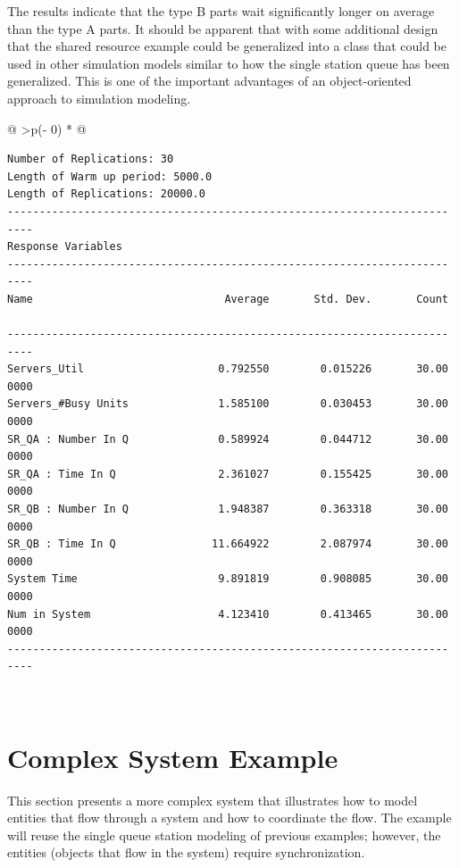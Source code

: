 \documentclass[
]{book}
\theoremstyle{definition}
\theoremstyle{definition}
\theoremstyle{definition}
\theoremstyle{definition}
\theoremstyle{remark}
\begin{document}
The results indicate that the type B parts wait
significantly longer on average than the type A parts. It should be
apparent that with some additional design that the shared resource
example could be generalized into a class that could be used in other
simulation models similar to how the single station queue has been
generalized. This is one of the important advantages of an
object-oriented approach to simulation modeling.

\begin{longtable}[]{@{}
  >{\centering\arraybackslash}p{(\columnwidth - 0\tabcolsep) * }@{}}
\toprule
\endhead
\begin{minipage}[t]{\linewidth}\raggedright
\hypertarget{fig:RSOutput}{%
\label{fig:RSOutput}}%
\begin{verbatim}
Number of Replications: 30
Length of Warm up period: 5000.0
Length of Replications: 20000.0
---------------------------------------------------------------------
----
Response Variables
---------------------------------------------------------------------
----
Name                              Average       Std. Dev.       Count

---------------------------------------------------------------------
----
Servers_Util                     0.792550        0.015226       30.00
0000
Servers_#Busy Units              1.585100        0.030453       30.00
0000
SR_QA : Number In Q              0.589924        0.044712       30.00
0000
SR_QA : Time In Q                2.361027        0.155425       30.00
0000
SR_QB : Number In Q              1.948387        0.363318       30.00
0000
SR_QB : Time In Q               11.664922        2.087974       30.00
0000
System Time                      9.891819        0.908085       30.00
0000
Num in System                    4.123410        0.413465       30.00
0000
---------------------------------------------------------------------
----
\end{verbatim}
\end{minipage} \\
\bottomrule
\end{longtable}

\hypertarget{dem:tiedyeShirts}{%
\section{Complex System Example}\label{dem:tiedyeShirts}}

This section presents a more complex system that illustrates how to
model entities that flow through a system and how to coordinate the
flow. The example will reuse the single queue station modeling of
previous examples; however, the entities (objects that flow in the
system) require synchronization.
\end{document}
